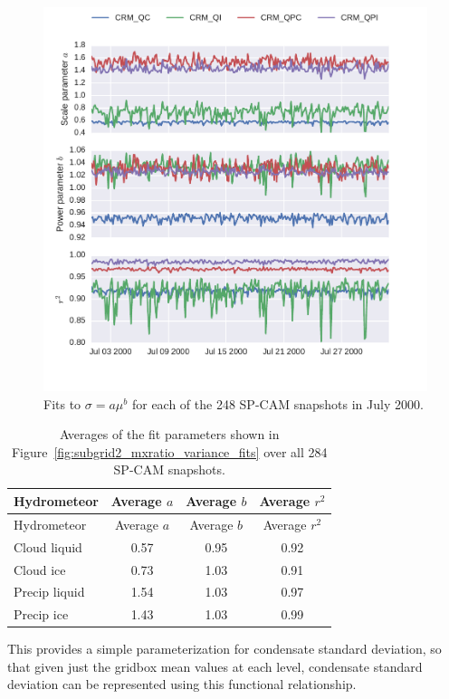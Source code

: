 \begin{figure}[htbp]
\centering
\includegraphics{graphics/subgrid2_mxratio_variance_fits.pdf}
\caption{\label{fig:subgrid2_mxratio_variance_fits}Fits to
\(\sigma = a \mu^b\) for each of the 248 SP-CAM snapshots in July
2000.}\label{fig:subgrid2ux5fmxratioux5fvarianceux5ffits}
\end{figure}

\begin{longtable}[]{@{}lccc@{}}
\caption{\label{tbl:subgrid2_mxratio_variance_fits_table}Averages of the
fit parameters shown in Figure~\ref{fig:subgrid2_mxratio_variance_fits}
over all 284 SP-CAM snapshots. }\tabularnewline
\toprule
Hydrometeor & Average \(a\) & Average \(b\) & Average
\(r^2\)\tabularnewline
\midrule
\endfirsthead
\toprule
Hydrometeor & Average \(a\) & Average \(b\) & Average
\(r^2\)\tabularnewline
\midrule
\endhead
Cloud liquid & 0.57 & 0.95 & 0.92\tabularnewline
Cloud ice & 0.73 & 1.03 & 0.91\tabularnewline
Precip liquid & 1.54 & 1.03 & 0.97\tabularnewline
Precip ice & 1.43 & 1.03 & 0.99\tabularnewline
\bottomrule
\end{longtable}

This provides a simple parameterization for condensate standard
deviation, so that given just the gridbox mean values at each level,
condensate standard deviation can be represented using this functional
relationship.

